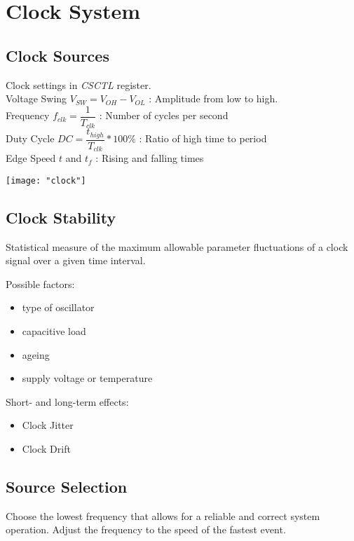 \section{Clock System}
\subsection{Clock Sources }
Clock settings in \textit{CSCTL} register.\\
Voltage Swing $V_{SW} = V_{OH} - V_{OL}$ : Amplitude from low to high.\\
Frequency $f_{clk} = \dfrac{1}{T_{clk}}$ : Number of cycles per second\\
Duty Cycle $DC = \dfrac{t_{high}}{T_{clk}} * 100 \%$ : Ratio of high time to period\\
Edge Speed $t$ and $t_f$ : Rising and falling times

\texttt{[image: "clock"]}

\subsection{Clock Stability }
Statistical measure of the maximum allowable parameter fluctuations of a clock signal
over a given time interval.

\begin{minipage}[t]{0.5\columnwidth}
	Possible factors:
	\begin{itemize}
		\itemsep-.5em 
		\item type of oscillator
		\item capacitive load
		\item ageing
		\item supply voltage or temperature
	\end{itemize}
\end{minipage}
\begin{minipage}[t]{0.5\columnwidth}
	Short- and long-term effects:
	\begin{itemize}
		\itemsep-.5em 
		\item Clock Jitter
		\item Clock Drift
	\end{itemize}
\end{minipage}
\vspace{2mm}

\subsection{Source Selection }
Choose the lowest frequency that allows for a reliable and correct system operation.
Adjust the frequency to the speed of the fastest event.


